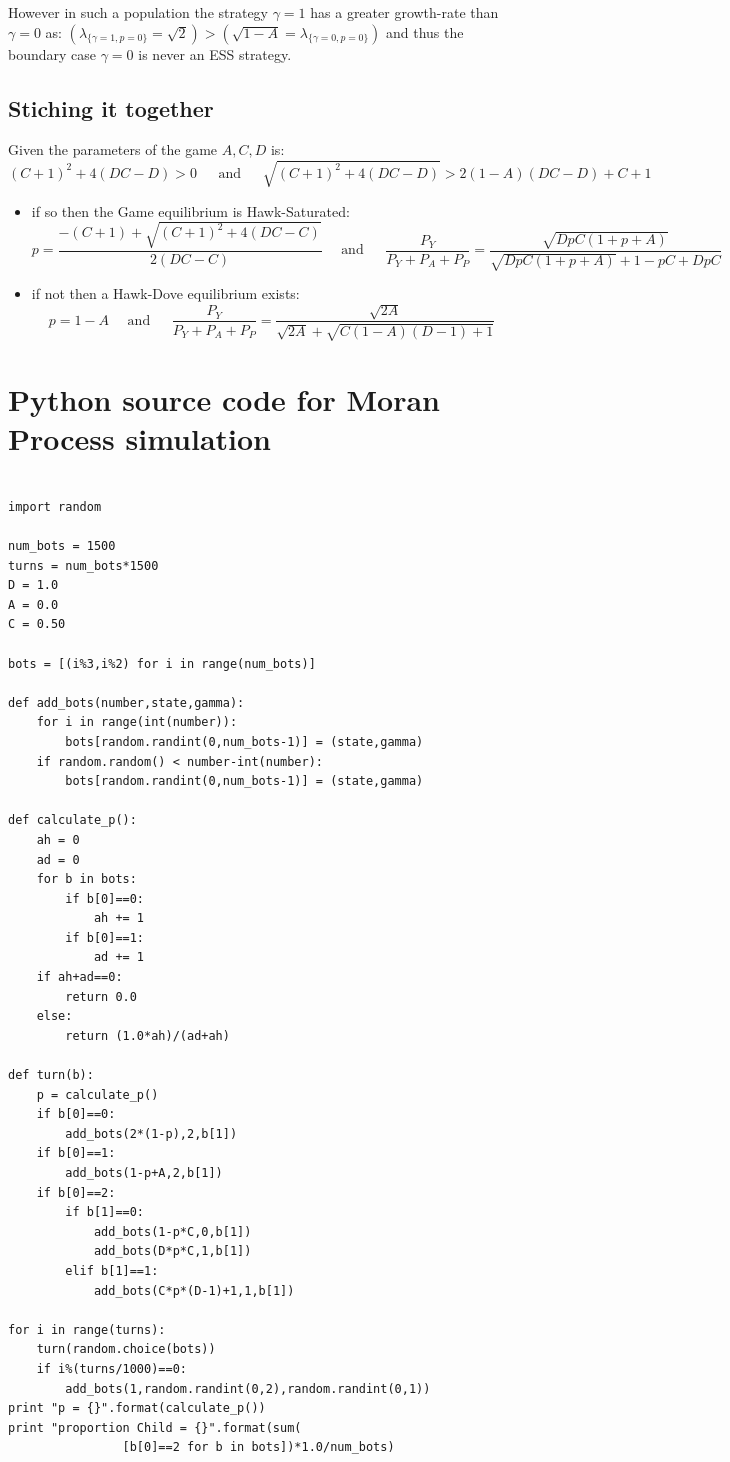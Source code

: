 \documentclass[journal,article,accept,oneauthors,pdftex,10pt,a4paper]{mdpi}
\begin{document}
However in such a population the strategy $\gamma=1$ has a greater growth-rate than $\gamma=0$ as: $\left(\lambda_{\{\gamma=1,p=0\}} = \sqrt{2}\right) > \left(\sqrt{1-A} = \lambda_{\{\gamma=0,p=0\}}\right)$
and thus the boundary case $\gamma=0$ is never an ESS strategy.

\subsection{Stiching it together}

Given the parameters of the game $A,C,D$ is: $$(C+1)^2+4(DC-D)>0 ~~~~~~~\text{and}~~~~~~~ \sqrt{(C+1)^2+4(DC-D)} > 2(1-A)(DC-D)+C+1  $$
\begin{itemize}[leftmargin=*,labelsep=3mm]
\item	if so then the Game equilibrium is Hawk-Saturated:$$p=\frac{-(C+1)+\sqrt{(C+1)^2+4(DC-C)}}{2(DC-C)}~~~~~~\text{and}~~~~~~~\frac{P_Y}{P_Y+P_A+P_P} = \frac{\sqrt{DpC(1+p+A)}}{\sqrt{DpC(1+p+A)}+1-pC+DpC}$$
\item	if not then a Hawk-Dove equilibrium exists:$$p=1-A~~~~~~\text{and}~~~~~~~\frac{P_Y}{P_Y+P_A+P_P} = \frac{\sqrt{2A}}{\sqrt{2A}+\sqrt{C(1-A)(D-1)+1}}$$
\end{itemize}

\section{Python source code for Moran Process simulation}

\begin{lstlisting}[frame=single]

import random

num_bots = 1500
turns = num_bots*1500
D = 1.0
A = 0.0
C = 0.50

bots = [(i%3,i%2) for i in range(num_bots)]

def add_bots(number,state,gamma):
    for i in range(int(number)):
        bots[random.randint(0,num_bots-1)] = (state,gamma)
    if random.random() < number-int(number):
        bots[random.randint(0,num_bots-1)] = (state,gamma)

def calculate_p():
    ah = 0
    ad = 0
    for b in bots:
        if b[0]==0:
            ah += 1
        if b[0]==1:
            ad += 1
    if ah+ad==0:
        return 0.0
    else:
        return (1.0*ah)/(ad+ah)

def turn(b):
    p = calculate_p()
    if b[0]==0:
        add_bots(2*(1-p),2,b[1])
    if b[0]==1:
        add_bots(1-p+A,2,b[1])
    if b[0]==2:
        if b[1]==0:
            add_bots(1-p*C,0,b[1])
            add_bots(D*p*C,1,b[1])
        elif b[1]==1:
            add_bots(C*p*(D-1)+1,1,b[1])

for i in range(turns):
    turn(random.choice(bots))
    if i%(turns/1000)==0:
        add_bots(1,random.randint(0,2),random.randint(0,1))
print "p = {}".format(calculate_p())
print "proportion Child = {}".format(sum(
                [b[0]==2 for b in bots])*1.0/num_bots)
\end{lstlisting}
\end{document}
